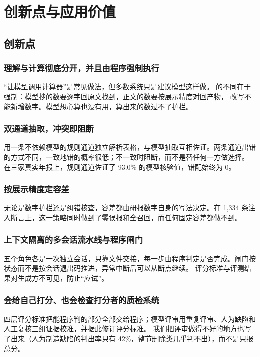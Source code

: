 \chapter{创新点与应用价值}

\section{创新点}

\subsection{理解与计算彻底分开，并且由程序强制执行}
“让模型调用计算器”是常见做法，但多数系统只是建议模型这样做。\sysname{} 的不同在于强制：模型抄的数要逐字回原文找到，正文的数要按展示精度对回产物，
改写不能新增数字。模型想心算也没有用，算出来的数过不了护栏。

\subsection{双通道抽取，冲突即阻断}
用一条不依赖模型的规则通道独立解析表格，与模型抽取互相佐证。两条通道出错的方式不同，一致地错的概率很低；不一致时阻断，而不是替任何一方做选择。
在三家真实年报上，规则通道佐证了 93.0\% 的模型核验值，错配始终为 0。

\subsection{按展示精度定容差}
无论是数字护栏还是纠错核查，容差都由研报数字自身的写法决定。在 1,334 条注入断言上，这一策略同时做到了零误报和全召回，而任何固定容差都做不到。

\subsection{上下文隔离的多会话流水线与程序闸门}
五个角色各是一次独立会话，只靠文件交接，每一步由程序判定是否完成。闸门按状态而不是按会话退出码推进，异常中断后可以从断点继续。
评分标准与评测结果对生成方不可见，防止“应试”。

\subsection{会给自己打分、也会检查打分者的质检系统}
四层评分标准把能程序判的部分全部交给程序；模型评审用重复评审、人为缺陷和人工复核三组证据校准，并据此修订评分标准。
我们把评审做得不好的地方也写了出来（人为制造缺陷的判出率只有 42\%，整节删除类几乎判不出），而不是只报总分。

